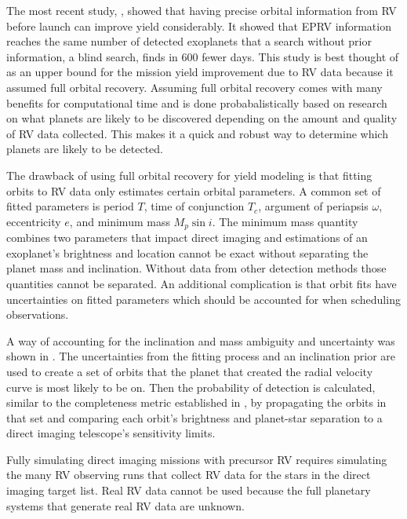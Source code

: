 The most recent study, \citet{morganExplorationExpectedNumber2022a}, showed
that having precise orbital information from RV before launch can improve yield
considerably. It showed that EPRV information reaches the same number of
detected exoplanets that a search without prior information, a blind search,
finds in 600 fewer days. This study is best thought of as an upper bound for
the mission yield improvement due to RV data because it assumed full orbital
recovery. Assuming full orbital recovery comes with many benefits for
computational time and is done probabalistically based on research on what
planets are likely to be discovered depending on the amount and quality of RV
data collected. This makes it a quick and robust way to determine which planets
are likely to be detected. 

The drawback of using full orbital recovery for yield modeling is that fitting
orbits to RV data only estimates certain orbital parameters. A common set of
fitted parameters is period $T$, time of conjunction $T_c$, argument of
periapsis $\omega$, eccentricity $e$, and minimum mass $M_p \sin{i}$. The
minimum mass quantity combines two parameters that impact direct imaging and
estimations of an exoplanet's brightness and location cannot be exact without
separating the planet mass and inclination. Without data from other detection
methods those quantities cannot be separated. An additional complication is
that orbit fits have uncertainties on fitted parameters which should be
accounted for when scheduling observations.

A way of accounting for the inclination and mass ambiguity and uncertainty was
shown in . The uncertainties from the fitting
process and an inclination prior are used to create a set of orbits that the
planet that created the radial velocity curve is most likely to be on. Then the
probability of detection is calculated, similar to the completeness metric
established in \citet{Brown2005d}, by propagating the orbits in that set and
comparing each orbit's brightness and planet-star separation to a direct
imaging telescope's sensitivity limits.

Fully simulating direct imaging missions with precursor RV requires simulating
the many RV observing runs that collect RV data for the stars in the direct
imaging target list. Real RV data cannot be used because the full planetary
systems that generate real RV data are unknown.

